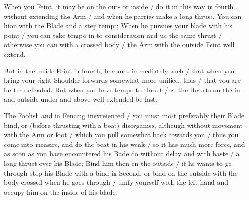 When you Feint, it may be on the out- or inside / do it in this way in
fourth . without extending the Arm / and when he parries make a long
thrust. You can hion with the Blade and a step tempt; When he pursues
your blade with his point / you can take tempo in to consideration and
ue the same thrust / otherwise you can with a crossed body / the Arm
with the outside Feint well extend.


But in the inside Feint in fourth, becomes immediately such / that
when you bring your right Shoulder forwards somewhat more unified,
thus / that you are better  defended. But when you have tempo to thrust / et the
thrusts on the in- and outside under and above well extended be fast.


The Foolish and in Fencing inexreienced / you must most preferably
their Blade bind, or (before thrusting with a beat) disorganise,
although without movement with the Arm or foot / which you pull
somewhat back towards you / thus you come into measire, and do the
beat in his weak / so it has much more force, and as soon as you have
encountered his Bade do without delay and with haste / a long thrust
over his Blade; Bind him then on the outside / if he wants to go
through stop his Blade with a bind in Second, or bind on the outside
with the body crossed when he goes through / unify yourself with the
left hand and occupy him on the inside of his blade.

